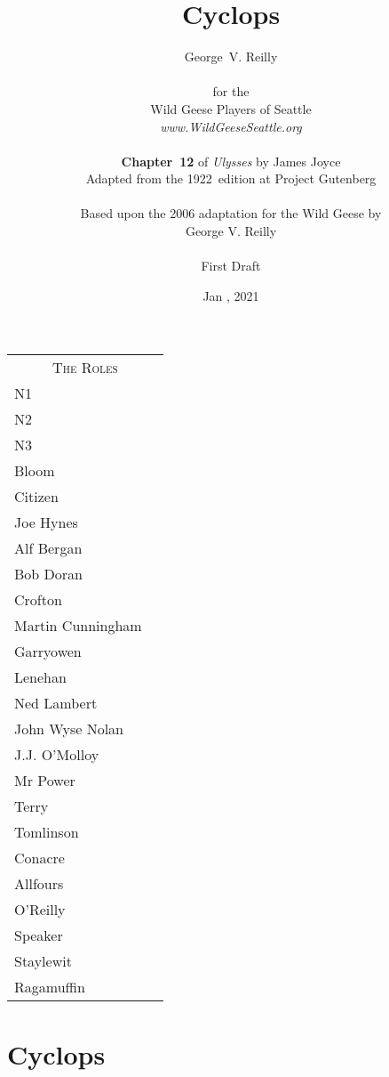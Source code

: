 


\title{\Huge Cyclops}
\author{George~V. Reilly\\
\\
{\small for the}\\
Wild Geese Players of Seattle\\
{\textit{www.WildGeeseSeattle.org}}\\
\\
{\small \textbf{Chapter~12} of \textit{Ulysses} by James Joyce}\\
{\small Adapted from the 1922~edition at Project Gutenberg}
\\
\\
{\small Based upon the 2006 adaptation for the Wild Geese by}\\
{\small George V. Reilly}\\
\\
{\small First Draft}}
\date{Jan , 2021}
\raggedbottom



\maketitle
\thispagestyle{empty}
\pagebreak

\begin{tabular}{lp{10cm}}
    \multicolumn{2}{c}{\Large \textsc{The Roles}} \\
N1 \\
N2 \\
N3 \\
Bloom \\
Citizen \\
Joe Hynes \\
Alf Bergan \\
Bob Doran \\
Crofton \\
Martin Cunningham \\
Garryowen \\
Lenehan \\
Ned Lambert \\
John Wyse Nolan \\
J.J. O'Molloy \\
Mr Power \\
Terry \\
Tomlinson \\
Conacre \\
Allfours \\
O'Reilly \\
Speaker \\
Staylewit \\
Ragamuffin \\


\end{tabular}

\thispagestyle{empty}
\newpage


\setcounter{page}{1}

\section*{Cyclops}




